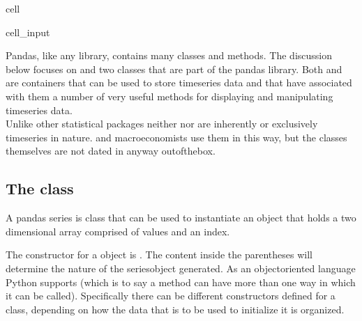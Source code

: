 \documentclass[letterpaper,10pt,english]{jupyterBook}
\begin{document}
\begin{sphinxuseclass}{cell}\begin{sphinxVerbatimInput}

\begin{sphinxuseclass}{cell_input}
\begin{sphinxVerbatim}[commandchars=\\\{\}]
    
\end{sphinxVerbatim}

\end{sphinxuseclass}\end{sphinxVerbatimInput}

\end{sphinxuseclass}
\sphinxAtStartPar
Pandas, like any library, contains many classes and methods.  The discussion below focuses on  and  two classes that are part of the pandas library.  Both  and  are containers that can be used to store time\sphinxhyphen{}series data and that have associated with them a number of very useful methods for displaying and manipulating time\sphinxhyphen{}series data.\\
Unlike other statistical packages neither  nor  are inherently or exclusively time\sphinxhyphen{}series in nature.   and macro\sphinxhyphen{}economists use them in this way, but the classes themselves are not dated in anyway out\sphinxhyphen{}of\sphinxhyphen{}the\sphinxhyphen{}box.


\subsection{The  class }
\label{\detokenize{content/04_PythonEssentials/PythonPandasDataframes:the-pandas-class-series}}
\sphinxAtStartPar
A pandas series is class that can be used to instantiate an object that holds a two dimensional array comprised of values and an index.

\sphinxAtStartPar
The constructor for a  object is .  The content inside the parentheses will determine the nature of the series\sphinxhyphen{}object generated.  As an object\sphinxhyphen{}oriented language Python supports  (which is to say a method can have more than one way in which it can be called). Specifically there can be different constructors defined for a class, depending on how the data that is to be used to initialize it is organized.
\end{document}
